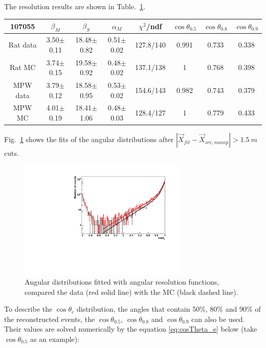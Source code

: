 The resolution results are shown in Table.~\ref{angularResolValues}.
\begin{table}[ht]
	\begin{tabular}{cccccccc}%
		\toprule
		107055& $\beta_M$ &  $\beta_S$ & $\alpha_M$ & $\chi^2$/ndf & $\cos\theta_{0.5}$ & $\cos\theta_{0.8}$& $\cos\theta_{0.9}$\\
		\hline
		Rat data & 3.50$\pm$0.11 & 18.48$\pm$0.82 & 0.51$\pm$0.02 & 127.8/140 & 0.991 & 0.733 & 0.338\\
		Rat MC  & 3.74$\pm$0.15 & 19.58$\pm$0.92 & 0.48$\pm$0.02 & 137.1/138 & 1 & 0.768 & 0.398\\	
		\hline
		MPW data & 3.79$\pm$0.12 & 18.58$\pm$0.95 & 0.53$\pm$0.02 & 154.6/143 & 0.982 & 0.743 & 0.379\\
		MPW MC &4.01$\pm$0.19 & 18.41$\pm$1.06 & 0.48$\pm$0.03 & 128.4/127 & 1 & 0.779 & 0.433  \\
		\bottomrule
	\end{tabular}
	\label{angularResolValues}
\end{table}


Fig.~\ref{angularResolMPW} shows the fits of the angular distributions after $|\vec{X}_{fit}-\vec{X}_{src,manip}|>1.5~m$ cuts.
\begin{figure}
	\centering
	\includegraphics[width=8cm]{angularResol_107055_mpw.pdf}
	\caption{Angular distributions fitted with angular resolution functions, compared the data (red solid line) with the MC (black dashed line).}
	\label{angularResolMPW}
\end{figure}

To describe the $\cos\theta_e$ distribution, the angles that contain 50\%, 80\%
and 90\% of the reconstructed events, the $\cos\theta_{0.5}$, $\cos\theta_{0.8}$ and $\cos\theta_{0.9}$ can also be used. Their values are solved numerically by the equation \ref{eq:cosTheta_e} below (take $\cos\theta_{0.5}$ as an example):

